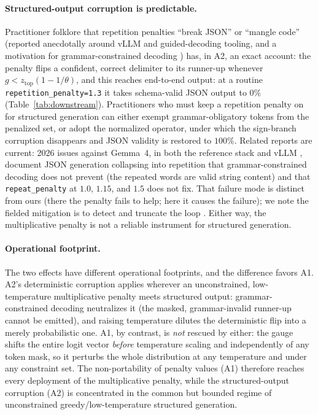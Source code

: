 \documentclass[11pt]{article}
\newcommand{\ztop}{z_{\mathrm{top}}}
\newcommand{\thp}{\theta}
\newcommand{\code}[1]{\texttt{#1}}
\begin{document}
\paragraph{Structured-output corruption is predictable.} Practitioner
folklore that repetition penalties ``break JSON'' or ``mangle code'' (reported anecdotally
around vLLM and guided-decoding tooling, and a motivation for grammar-constrained decoding
\citep{willard2023outlines}) has, in A2, an exact account: the penalty flips a confident,
correct delimiter to its runner-up whenever $g < \ztop(1-1/\thp)$, and this reaches
end-to-end output: at a routine \code{repetition\_penalty=1.3} it takes schema-valid JSON
output to $0\%$ (Table~\ref{tab:downstream}). Practitioners who must keep a repetition penalty
on for structured generation can either exempt grammar-obligatory tokens from the penalized
set, or adopt the normalized operator, under which the sign-branch corruption
disappears and JSON validity is restored to $100\%$. Related reports are current: 2026 issues against
Gemma~4, in both the reference stack \citep{gemma622} and vLLM \citep{vllm40080}, document JSON
generation collapsing into repetition that grammar-constrained decoding does not prevent (the
repeated words are valid string content) and that \code{repeat\_penalty} at $1.0$, $1.15$, and
$1.5$ does not fix. That failure mode is distinct from ours (there the penalty
fails to help; here it causes the failure); we note the fielded mitigation is to detect and
truncate the loop
\citep{vllm40099}. Either way, the
multiplicative penalty is not a reliable instrument for structured generation.

\paragraph{Operational footprint.} The two effects have different
operational footprints, and the difference favors A1. A2's deterministic corruption applies
wherever an unconstrained, low-temperature multiplicative penalty meets structured output:
grammar-constrained decoding \citep{willard2023outlines} neutralizes it (the masked,
grammar-invalid runner-up cannot be emitted), and raising temperature dilutes the deterministic
flip into a merely probabilistic one. A1, by contrast, is \emph{not} rescued by either:
the gauge shifts the entire logit vector \emph{before} temperature scaling and independently of
any token mask, so it perturbs the whole distribution at any temperature and under any
constraint set. The non-portability of penalty values (A1) therefore reaches every deployment
of the multiplicative penalty, while the structured-output corruption (A2) is concentrated in the
common but bounded regime of unconstrained greedy/low-temperature structured generation.
\end{document}

